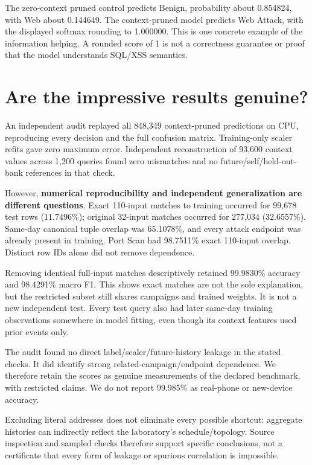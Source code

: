 \documentclass[11pt,a4paper,oneside]{report}
\begin{document}
The zero-context pruned control predicts Benign, probability about 0.854824, with Web about 0.144649. The context-pruned model predicts Web Attack, with the displayed softmax rounding to 1.000000. This is one concrete example of the information helping. A rounded score of 1 is not a correctness guarantee or proof that the model understands SQL/XSS semantics.

\section{Are the impressive results genuine?}
An independent audit replayed all 848,349 context-pruned predictions on CPU, reproducing every decision and the full confusion matrix. Training-only scaler refits gave zero maximum error. Independent reconstruction of 93,600 context values across 1,200 queries found zero mismatches and no future/self/held-out-bank references in that check.

However, \textbf{numerical reproducibility and independent generalization are different questions}. Exact 110-input matches to training occurred for 99,678 test rows (11.7496\%); original 32-input matches occurred for 277,034 (32.6557\%). Same-day canonical tuple overlap was 65.1078\%, and every attack endpoint was already present in training. Port Scan had 98.7511\% exact 110-input overlap. Distinct row IDs alone did not remove dependence.

Removing identical full-input matches descriptively retained 99.9830\% accuracy and 98.4291\% macro F1. This shows exact matches are not the sole explanation, but the restricted subset still shares campaigns and trained weights. It is not a new independent test. Every test query also had later same-day training observations somewhere in model fitting, even though its context features used prior events only.

The audit found no direct label/scaler/future-history leakage in the stated checks. It did identify strong related-campaign/endpoint dependence. We therefore retain the scores as genuine measurements of the declared benchmark, with restricted claims. We do not report 99.985\% as real-phone or new-device accuracy.

Excluding literal addresses does not eliminate every possible shortcut: aggregate histories can indirectly reflect the laboratory's schedule/topology. Source inspection and sampled checks therefore support specific conclusions, not a certificate that every form of leakage or spurious correlation is impossible.
\end{document}
